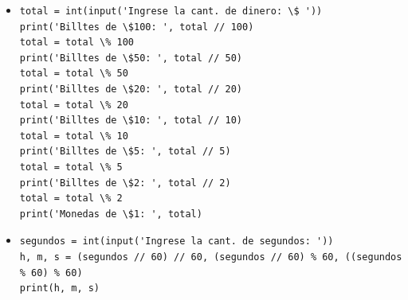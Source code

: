 \documentclass[a4paper,10pt]{article}
\begin{document}
\begin{itemize}
\item[7]
\begin{small}
\begin{verbatim}
total = int(input('Ingrese la cant. de dinero: \$ '))
print('Billtes de \$100: ', total // 100)
total = total \% 100
print('Billtes de \$50: ', total // 50)
total = total \% 50
print('Billtes de \$20: ', total // 20)
total = total \% 20
print('Billtes de \$10: ', total // 10)
total = total \% 10
print('Billtes de \$5: ', total // 5)
total = total \% 5
print('Billtes de \$2: ', total // 2)
total = total \% 2
print('Monedas de \$1: ', total)
\end{verbatim}
\end{small}

\item[8]
\begin{small}
\begin{verbatim}
segundos = int(input('Ingrese la cant. de segundos: '))
h, m, s = (segundos // 60) // 60, (segundos // 60) % 60, ((segundos % 60) % 60)
print(h, m, s)  
\end{verbatim}
\end{small}

\end{itemize}
\end{document}
